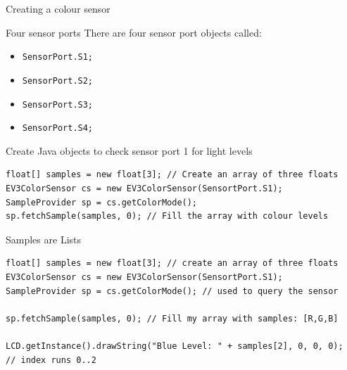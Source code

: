 \documentclass[color=pdftex,usenames,dvipsnames, aspectratio=169]{beamer}
\begin{document}
\begin{frame}[fragile=singleslide]{Creating a colour sensor}
\begin{block}{Four sensor ports}
There are four sensor port objects called:
\begin{itemize}
\item \lstinline!SensorPort.S1;!
\item \lstinline!SensorPort.S2;!
\item \lstinline!SensorPort.S3;!
\item \lstinline!SensorPort.S4;!
\end{itemize}
\end{block}

\begin{block}{Create Java objects to check sensor port 1 for light levels}
\end{block}
{
  \lstset{xleftmargin=0.1in, xrightmargin=0in, framexleftmargin=0in}

  \begin{lstlisting}[emph={cs,sp,samples},linewidth=0.98\textwidth]
float[] samples = new float[3]; // Create an array of three floats
EV3ColorSensor cs = new EV3ColorSensor(SensortPort.S1);
SampleProvider sp = cs.getColorMode();
sp.fetchSample(samples, 0); // Fill the array with colour levels
\end{lstlisting}
}
\end{frame}


\begin{frame}[fragile]{Samples are Lists}

\begin{lstlisting}[xrightmargin=0in, xleftmargin=0in, framexleftmargin=0in, emph={cs,sp,samples},linewidth=1.01\textwidth]
float[] samples = new float[3]; // create an array of three floats
EV3ColorSensor cs = new EV3ColorSensor(SensortPort.S1);
SampleProvider sp = cs.getColorMode(); // used to query the sensor

sp.fetchSample(samples, 0); // Fill my array with samples: [R,G,B]

LCD.getInstance().drawString("Blue Level: " + samples[2], 0, 0, 0); 
// index runs 0..2
\end{lstlisting}
\end{frame}
\end{document}
